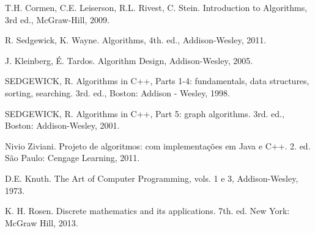{{        T.H. Cormen, C.E. Leiserson, R.L. Rivest, C. Stein. Introduction to Algorithms, 3rd ed., McGraw-Hill, 2009.

        R. Sedgewick, K. Wayne. Algorithms, 4th. ed., Addison-Wesley, 2011.
    }{
        J. Kleinberg, É. Tardos. Algorithm Design, Addison-Wesley, 2005.

        SEDGEWICK,  R. Algorithms in C++, Parts 1-4: fundamentals, data structures, sorting, searching. 3rd. ed., Boston: Addison - Wesley, 1998.

        SEDGEWICK, R. Algorithms in C++, Part 5: graph algorithms. 3rd. ed., Boston: Addison-Wesley, 2001.

        Nivio Ziviani. Projeto de algoritmos: com implementações em Java e C++. 2. ed. São Paulo: Cengage Learning, 2011.

        D.E. Knuth. The Art of Computer Programming, vols. 1 e 3, Addison-Wesley, 1973.

        K. H. Rosen. Discrete mathematics and its applications. 7th. ed. New York: McGraw Hill, 2013.
    }
}